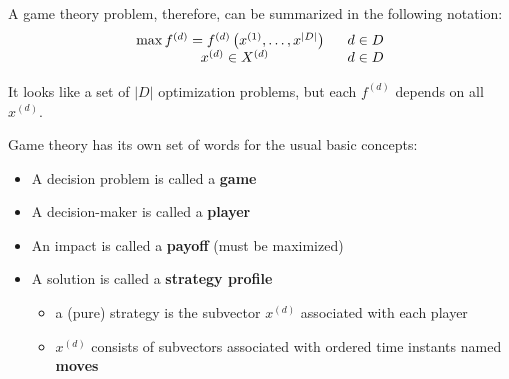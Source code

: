 A game theory problem, therefore, can be summarized in the following notation:
$$\begin{array}{c c}
	\max f^{(d)} = f^{(d)} \left(x^{(1)}, \dots, x^{|D|}\right) \ \ & d \in D \\
	x^{(d)} \in X^{(d)} & d \in D
\end{array}$$

It looks like a set of $|D|$ optimization problems, but each $f^{(d)}$ depends on all $x^{(d)}$.

Game theory has its own set of words for the usual basic concepts: 
\begin{itemize}
	\item A decision problem is called a \textbf{game}
	
	\item A decision-maker is called a \textbf{player}
	
	\item An impact is called a \textbf{payoff} (must be maximized)
	
	\item A solution is called a \textbf{strategy profile}
	\begin{itemize}
		\item a (pure) strategy is the subvector $x^{(d)}$ associated with each player
		
		\item $x^{(d)}$ consists of subvectors associated with ordered time instants named \textbf{moves}
	\end{itemize}
\end{itemize}


